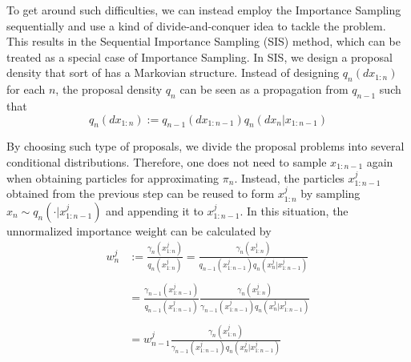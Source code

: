 \documentclass[12pt,a4paper]{article}
\begin{document}
To get around such difficulties, we can instead employ the Importance Sampling sequentially and use a kind of divide-and-conquer idea to tackle the problem. This results in the Sequential Importance Sampling (SIS) method, which can be treated as a special case of Importance Sampling. In SIS, we design a proposal density that sort of has a Markovian structure. Instead of designing $q_n(dx_{1:n})$ for each $n$, the proposal density $q_n$ can be seen as a propagation from $q_{n-1}$ such that 
$$q_n(dx_{1:n}) := q_{n-1}(dx_{1:n-1})q_n(dx_n|x_{1:n-1})$$

By choosing such type of proposals, we divide the proposal problems into several conditional distributions. Therefore, one does not need to sample $x_{1:n-1}$ again when obtaining particles for approximating $\pi_n$. Instead, the particles $x_{1:n-1}^j$ obtained from the previous step can be reused to form $x_{1:n}^j$ by sampling $x_n \sim q_n\left(\cdot|x_{1:n-1}^j\right)$ and appending it to $x_{1:n-1}^j$. In this situation, the unnormalized importance weight can be calculated by 
\begin{equation}
    \label{SIS-Unnormalzied Weight}
\begin{split}
    w_{n}^j &:= \frac{\gamma_n\left(x_{1:n}^j\right)}{q_n\left(x_{1:n}^j\right)} = \frac{\gamma_n\left(x_{1:n}^j\right)}{q_{n-1}\left(x_{1:n-1}^j\right)q_n\left(x_n^j|x_{1:n-1}^j\right)} \\\\
    &=\frac{\gamma_{n-1}\left(x_{1:n-1}^j\right)}{q_{n-1}\left(x_{1:n-1}^j\right)} \frac{\gamma_{n}\left(x_{1:n}^j\right)}{\gamma_{n-1}\left(x_{1:n-1}^j\right) q_n\left(x_n^j|x_{1:n-1}^j\right)}\\\\
    &= w_{n-1}^j \frac{\gamma_{n}\left(x_{1:n}^j\right)}{\gamma_{n-1}\left(x_{1:n-1}^j\right) q_n\left(x_n^j|x_{1:n-1}^j\right)}
\end{split}
\end{equation}
\end{document}
